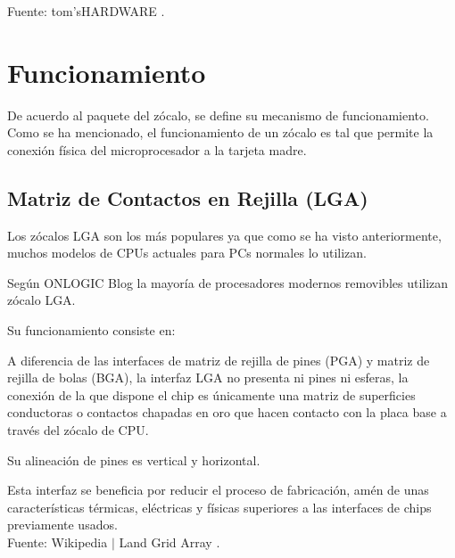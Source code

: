 \documentclass[conference]{IEEEtran}
\begin{document}
\small Fuente: tom'sHARDWARE \cite{harding-2021}.

\section{Funcionamiento}

De acuerdo al paquete del zócalo, se define su mecanismo de funcionamiento. Como se ha mencionado, el funcionamiento de un zócalo es tal que permite la conexión física del microprocesador a la tarjeta madre.

\subsection{Matriz de Contactos en Rejilla (LGA)}

Los zócalos LGA son los más populares ya que como se ha visto anteriormente, muchos modelos de CPUs actuales para PCs normales lo utilizan.

\bigbreak

Según ONLOGIC Blog \cite{fanton-2021} la mayoría de procesadores modernos removibles utilizan zócalo LGA.

\bigbreak

Su funcionamiento consiste en:

\bigbreak

\begin{displayquote}
    A diferencia de las interfaces de matriz de rejilla de pines (PGA) y matriz de rejilla de bolas (BGA), la interfaz LGA no presenta ni pines ni esferas, la conexión de la que dispone el chip es únicamente una matriz de superficies conductoras o contactos chapadas en oro que hacen contacto con la placa base a través del zócalo de CPU.

    \bigbreak

    Su alineación de pines es vertical y horizontal.
    
    \bigbreak
    
    Esta interfaz se beneficia por reducir el proceso de fabricación, amén de unas características térmicas, eléctricas y físicas superiores a las interfaces de chips previamente usados.\\
    \small
    Fuente: Wikipedia $\mid$ Land Grid Array \cite{wikipedia-lga-2021D}.
\end{displayquote}
\end{document}
